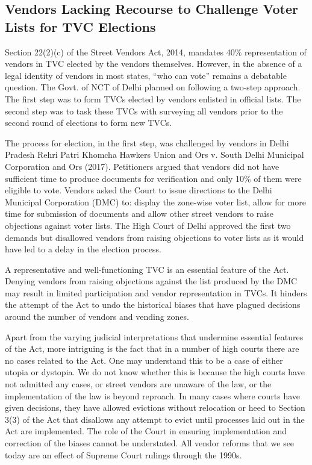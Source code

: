 \documentclass[a4paper, 12pt, twoside]{article}
\begin{document}
{\subsection*{Vendors Lacking Recourse to Challenge Voter Lists for TVC Elections}

Section 22(2)(c) of the Street Vendors Act, 2014, mandates 40\% representation of vendors in TVC elected by the vendors themselves. However, in the absence of a legal identity of vendors in most states, “who can vote” remains a debatable question.
The Govt. of NCT of Delhi planned on following a two-step approach. The first step was to form TVCs elected by vendors enlisted in official lists. The second step was to task these TVCs with surveying all vendors prior to the second round of elections to form new TVCs.

The process for election, in the first step, was challenged by vendors in Delhi Pradesh Rehri Patri Khomcha Hawkers Union and Ors v. South Delhi Municipal Corporation and Ors (2017). Petitioners argued that vendors did not have sufficient time to produce documents for verification and only 10\% of them were eligible to vote. Vendors asked the Court to issue directions to the Delhi Municipal Corporation (DMC) to: display the zone-wise voter list, allow for more time for submission of documents and allow other street vendors to raise objections against voter lists. The High Court of Delhi approved the first two demands but disallowed vendors from raising objections to voter lists as it would have led to a delay in the election process.

A representative and well-functioning TVC is an essential feature of the Act. Denying vendors from raising objections against the list produced by the DMC may result in limited participation and vendor representation in TVCs. It hinders the attempt of the Act to undo the historical biases that have plagued decisions around the number of vendors and vending zones.

Apart from the varying judicial interpretations that undermine essential features of the Act, more intriguing is the fact that in a number of high courts there are no cases related to the Act. One may understand this to be a case of either utopia or dystopia. We do not know whether this is because the high courts have not admitted any cases, or street vendors are unaware of the law, or the implementation of the law is beyond reproach. In many cases where courts have given decisions, they have allowed evictions without relocation or heed to Section 3(3) of the Act that disallows any attempt to evict until processes laid out in the Act are implemented. The role of the Court in ensuring implementation and correction of the biases cannot be understated. All vendor reforms that we see today are an effect of Supreme Court rulings through the 1990s. %

}
\end{document}
